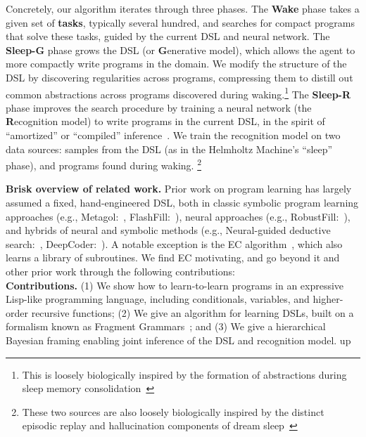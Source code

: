 \documentclass{article}
\newcommand{\system}{\textsc{DreamCoder}~}
\begin{document}
Concretely, our algorithm iterates through three phases. 
The \textbf{Wake} phase takes a given set of \textbf{tasks}, typically
several hundred, and searches for compact programs that solve these tasks,
guided by the current DSL and neural network.
The \textbf{Sleep-G} phase grows the DSL (or \textbf{G}enerative model),
which allows the agent to more compactly
write programs in the domain. We modify the structure of the DSL by
discovering regularities across programs, compressing
them to distill out common abstractions across  programs discovered during waking.\footnote{This is loosely biologically
    inspired by the formation of abstractions during sleep memory
    consolidation~\cite{DUDAI201520}}
The \textbf{Sleep-R} phase improves the search procedure by training a neural network (the \textbf{R}ecognition model) to
write programs in the current DSL, in the spirit of ``amortized'' or
``compiled'' inference~\cite{le2016inference}.
We train the recognition model on  two data sources: samples
from the DSL (as in the Helmholtz Machine's ``sleep'' phase), and
programs found during waking.%
\footnote{These two sources are also
    loosely biologically inspired by the distinct episodic replay and
    hallucination components of dream sleep~\cite{fosse2003dreaming}}
    

\textbf{Brisk overview of related work.} Prior work on program learning has largely assumed a fixed, hand-engineered DSL,
both in classic symbolic program learning approaches (e.g., Metagol:~\cite{muggleton2015meta},
FlashFill:~\cite{gulwani2011automating}),
neural approaches  (e.g., RobustFill:~\cite{devlin2017robustfill}), and hybrids of neural and
symbolic methods (e.g., Neural-guided deductive search:~\cite{ngds}, DeepCoder:~\cite{balog2016deepcoder}).
A notable exception is the EC algorithm~\cite{Dechter:2013:BLV:2540128.2540316},
which also learns a library of subroutines.
We find EC motivating, and go beyond it and other prior work through the following contributions: %
\\\textbf{Contributions.} (1) We show how to learn-to-learn programs in an expressive Lisp-like programming language, including conditionals, variables, and higher-order recursive functions;
(2) We give an algorithm for learning DSLs,
built on a formalism known as Fragment Grammars~\cite{tim};
and (3) We give a hierarchical Bayesian framing enabling joint inference of the DSL and recognition model.
up
\end{document}
